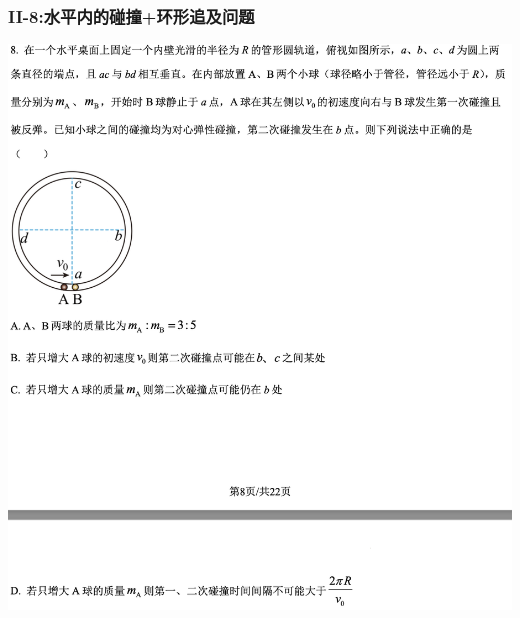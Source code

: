 \documentclass{article}
\begin{document}
\vspace{2em}

\subsubsection{II-8:水平内的碰撞+环形追及问题}
\includegraphics[width=50em,keepaspectratio]{./pictures/1.2-3.png}
\end{document}
